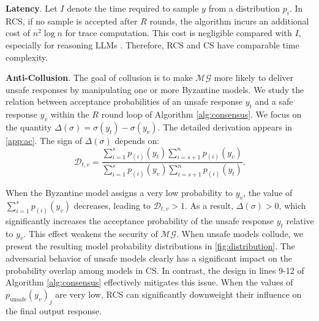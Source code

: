 \documentclass[11pt]{article}
\begin{document}
\begin{table}
\centering
 \caption{A comprehensive comparison between our proposed RCS and existing method.}
    \label{tab:compare}
\end{table}


\noindent
\textbf{Latency}. Let $I$ denote the time required to sample $y$ from a distribution $p_i$.
In RCS, if no sample is accepted after $R$ rounds, the algorithm incurs an additional cost of $n^2 \log n$ for trace computation. This cost is negligible compared with $I$, especially for reasoning LLMs \citep{chen2025towards}. Therefore, RCS and CS have comparable time complexity.



\noindent
\textbf{Anti-Collusion}. The goal of collusion is to make $\mathcal{MG}$ more likely to deliver unsafe responses by manipulating one or more Byzantine models. We study the relation between acceptance probabilities of an unsafe response $y_t$ and a safe response $y_v$ within the $R$ round loop of Algorithm \ref{alg:consensus}. We focus on the quantity $\Delta(\sigma) = \sigma(y_t) - \sigma(y_v)$. The detailed derivation appears in \autoref{app:ac}. The sign of $\Delta(\sigma)$ depends on:
\[
\mathcal{D}_{t,v} =
\frac{
\sum_{i = 1}^{s} p_{(i)}(y_t) \sum_{i = s+1}^{n} p_{(i)}(y_v)
}{
\sum_{i = 1}^{s} p_{(i)}(y_v) \sum_{i = s+1}^{n} p_{(i)}(y_t)
}.
\]

When the Byzantine model assigns a very low probability to $y_v$, the value of
$\sum_{i=1}^{s} p_{(i)}(y_v)$ decreases, leading to $\mathcal{D}_{t,v} > 1$. As a result, $\Delta(\sigma) > 0$, which significantly increases the acceptance probability of the unsafe response $y_t$ relative to $y_v$. This effect weakens the security of $\mathcal{MG}$. When unsafe models collude, we present the resulting model probability distributions in \autoref{fig:distribution}. The adversarial behavior of unsafe models clearly has a significant impact on the probability overlap among models in CS. In contrast, the design in lines 9-12 of Algorithm \ref{alg:consensus} effectively mitigates this issue. When the values of $p_{\text{unsafe}}(y_v)_j$ are very low, RCS can significantly downweight their influence on the final output response.
\end{document}
